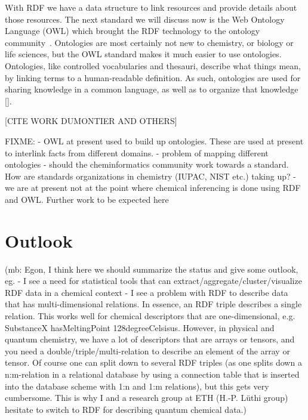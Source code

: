 \documentclass[10pt]{bmc_article}
\newenvironment{bmcformat}{\begin{raggedright}\baselineskip20pt\sloppy\setboolean{publ}{false}}{\end{raggedright}\baselineskip20pt\sloppy}
\begin{document}
\begin{bmcformat}
With RDF we have a data structure to link resources and provide details about
those resources. The next standard we will discuss now is the Web Ontology
Language (OWL) which brought the RDF technology to the ontology community~\cite{GUN2004}.
Ontologies are most certainly not new to chemistry, or biology or life sciences,
but the OWL standard makes it much easier to use ontologies. Ontologies, like
controlled vocabularies and thesauri, describe what things mean, by linking
terms to a human-readable definition. As such, ontologies are used for sharing
knowledge in a common language, as well as to organize that knowledge []. 

[CITE WORK DUMONTIER AND OTHERS]

FIXME:
- OWL at present used to build up ontologies. These are used at present to
interlink facts from different domains. 
- problem of mapping different ontologies - should the cheminformatics community
work towards a standard. How are standards organizations in chemistry (IUPAC,
NIST etc.) taking up?
- we are at present not at the point where chemical inferencing is done using
RDF and OWL. Further work to be expected here


\section{Outlook}

(mb: Egon, I think here we should summarize the status and give some outlook, eg. 
- I see a need for statistical tools that can
extract/aggregate/cluster/visualize RDF data in a chemical context
- I see a problem with RDF to describe data that has multi-dimensional
relations. In essence, an RDF triple describes a single relation. This works
well for chemical descriptors that are one-dimensional, e.g. SubstanceX
hasMeltingPoint 128degreeCelsisus. However, in physical and quantum chemistry,
we have a lot of descriptors that are arrays or tensors, and you need a
double/triple/multi-relation to describe an element of the array or tensor. Of
course one can split down to several RDF triples (as one splits down a
n:m-relation in a relational database by using a connection table that is
inserted into the database scheme with 1:n and 1:m relations), but this gets
very cumbersome. This is why I and a research group at ETH (H.-P. Lüthi group)
hesitate to switch to RDF for describing quantum chemical data.)





\end{bmcformat}
\end{document}
